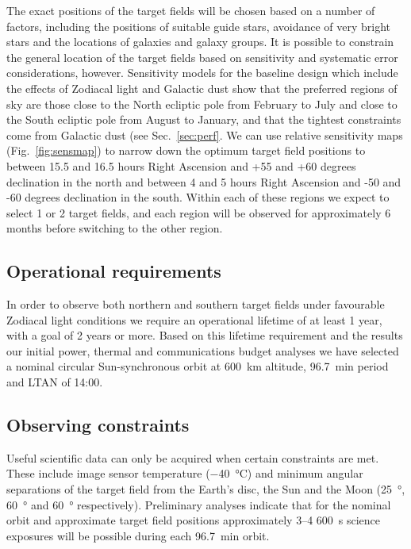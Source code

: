 \documentclass[]{iac}
\begin{document}
The exact positions of the target fields will be chosen based on a number of factors, including the positions of
suitable guide stars, avoidance of very bright stars and the locations of galaxies and galaxy groups. It is possible to
constrain the general location of the target fields based on sensitivity and systematic error considerations, however.
Sensitivity models for the baseline design which include the effects of Zodiacal light and Galactic dust show that the
preferred regions of sky are those close to the North ecliptic pole from February to July and close to the South
ecliptic pole from August to January, and that the tightest constraints come from Galactic dust (see
Sec.~\ref{sec:perf}. We can use relative sensitivity maps (Fig.~\ref{fig:sensmap}) to narrow down the optimum target
field positions to between 15.5 and 16.5 hours Right Ascension and +55 and +60 degrees declination in the north and
between 4 and 5 hours Right Ascension and -50 and -60 degrees declination in the south. Within each of these regions we
expect to select 1 or 2 target fields, and each region will be observed for approximately 6 months before switching to
the other region.

\subsection{Operational requirements}

In order to observe both northern and southern target fields under favourable Zodiacal light conditions we require an
operational lifetime of at least 1 year, with a goal of 2 years or more. Based on this lifetime requirement and the
results our initial power, thermal and communications budget analyses we have selected a nominal circular
Sun-synchronous orbit at \SI{600}{\kilo\metre} altitude, \SI{96.7}{\minute} period and LTAN of 14:00.

\subsection{Observing constraints}
\label{sec:obsconst}

Useful scientific data can only be acquired when certain constraints are met. These include image sensor temperature
(\SI{-40}{\celsius}) and minimum angular separations of the target field from the Earth's disc, the Sun and the Moon
(\SI{25}{\degree}, \SI{60}{\degree} and \SI{60}{\degree} respectively). Preliminary analyses indicate that for the
nominal orbit and approximate target field positions approximately 3--4 \SI{600}{\second} science exposures will be
possible during each \SI{96.7}{\minute} orbit.
\end{document}
